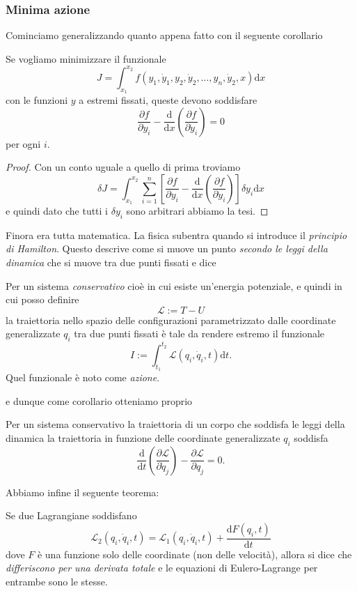\documentclass[11pt]{scrartcl}
\newcommand{\dif}{\text{d}}
\begin{document}
	\subsubsection{Minima azione}
	Cominciamo generalizzando quanto appena fatto con il seguente corollario
	\begin{corollary}
		Se vogliamo minimizzare il funzionale
		$$J=\int_{x_1}^{x_2}f(y_1,\dot{y}_1,y_2,\dot{y}_2,\dots,y_n,\dot{y}_2,x)\dif x$$
		con le funzioni $y$ a estremi fissati, queste devono soddisfare		
		$$\frac{\partial f}{\partial y_i}-\frac{\dif }{\dif x}\left(\frac{\partial f}{\partial \dot{y}_i}\right)=0$$
		per ogni $i$.
	\end{corollary}
	\begin{proof}
		Con un conto uguale a quello di prima troviamo
		$$\delta J=\int_{x_1}^{x_2}\sum_{i=1}^{n}\left[\frac{\partial f}{\partial y_i}-\frac{\dif }{\dif x}\left(\frac{\partial f}{\partial \dot{y}_i}\right)\right]\delta y_i \dif x$$
		e quindi dato che tutti i $\delta y_i$ sono arbitrari abbiamo la tesi.
	\end{proof}
	Finora era tutta matematica. La fisica subentra quando si introduce il \textit{principio di Hamilton}. Questo descrive come si muove un punto \textit{secondo le leggi della dinamica} che si muove tra due punti fissati e dice
	\begin{proposition}
		Per un sistema \textit{conservativo} cioè in cui esiste un'energia potenziale, e quindi in cui posso definire 
		$$\mathcal{L}:=T-U$$
		la traiettoria nello spazio delle configurazioni parametrizzato dalle coordinate generalizzate $q_i$ tra due punti fissati è tale da rendere estremo il funzionale
		$$I:=\int_{t_1}^{t_2}\mathcal{L}\left(q_i,\dot{q}_i,t\right)\dif t.$$
		Quel funzionale è noto come \textit{azione}.
	\end{proposition}
	e dunque come corollario otteniamo proprio
	\begin{corollary}
		Per un sistema conservativo la traiettoria di un corpo che soddisfa le leggi della dinamica la traiettoria in funzione delle coordinate generalizzate $q_i$ soddisfa
		$$\frac{\dif}{\dif t}\left(\frac{\partial \mathcal{L}}{\partial \dot{q}_j}\right)-\frac{\partial \mathcal{L}}{\partial q_j}=0.$$
	\end{corollary}
	Abbiamo infine il seguente teorema:
	\begin{theorem}
		Se due Lagrangiane soddisfano
		$$\mathcal{L}_2(q_i,\dot{q}_i,t)=\mathcal{L}_1(q_i,\dot{q}_i,t)+\frac{\dif F(q_i,t)}{\dif t}$$
		dove $F$ è una funzione solo delle coordinate (non delle velocità), allora si dice che \textit{differiscono per una derivata totale} e le equazioni di Eulero-Lagrange per entrambe sono le stesse.
	\end{theorem}
\end{document}
